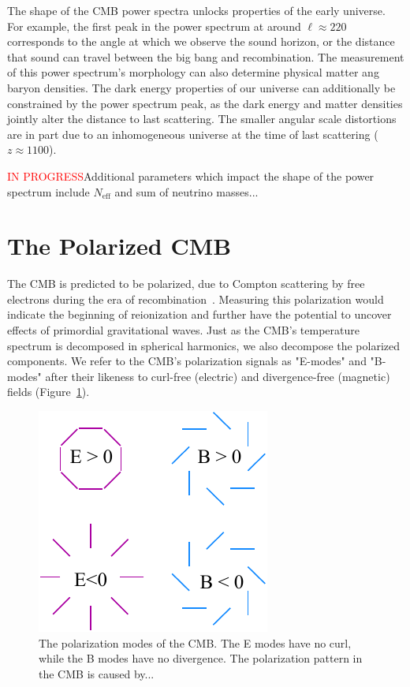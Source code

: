 The shape of the CMB power spectra unlocks properties of the early universe.  For example, the first peak in the power spectrum at around $\ell\approx220$ corresponds to the angle at which we observe the sound horizon, or the distance that sound can travel between the big bang and recombination.  The measurement of this power spectrum's morphology can also determine physical matter ang baryon densities.  The dark energy properties of our universe can additionally be constrained by the power spectrum peak, as the dark energy and matter densities jointly alter the distance to last scattering.  The smaller angular scale distortions are in part due to an inhomogeneous universe at the time of last scattering ($z\approx 1100$).  

\textcolor{red}{IN PROGRESS}Additional parameters which impact the shape of the power spectrum include $N_{\text{eff}}$ and sum of neutrino masses...

\section{The Polarized CMB}

The CMB is predicted to be polarized, due to Compton scattering by free electrons during the era of recombination~\cite{weinberg_cosmo}.  Measuring this polarization would indicate the beginning of reionization and further have the potential to uncover effects of primordial gravitational waves.  Just as the CMB's temperature spectrum is decomposed in spherical harmonics, we also decompose the polarized components.  We refer to the CMB's polarization signals as "E-modes" and "B-modes" after their likeness to curl-free (electric) and divergence-free (magnetic) fields (Figure~\ref{fig:e_b_pol}).
\begin{figure}
    \centering
    \includegraphics[width = .45\textwidth]{Figures/EB_pol.pdf}
    \caption{The polarization modes of the CMB.  The E modes have no curl, while the B modes have no divergence.  The polarization pattern in the CMB is caused by...}
    \label{fig:e_b_pol}
\end{figure}

